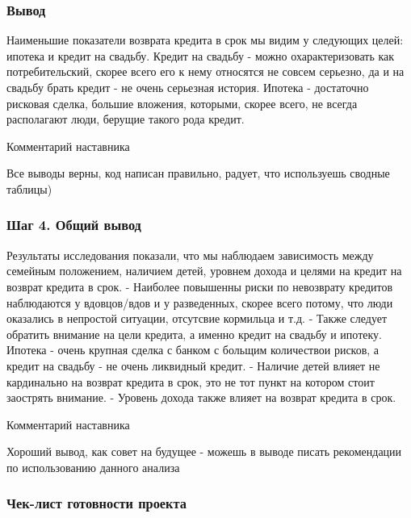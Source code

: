 \documentclass[11pt]{article}
\begin{document}
    \hypertarget{ux432ux44bux432ux43eux434}{%
\subsubsection{Вывод}\label{ux432ux44bux432ux43eux434}}

    Наименьшие показатели возврата кредита в срок мы видим у следующих
целей: ипотека и кредит на свадьбу. Кредит на свадьбу - можно
охарактеризовать как потребительский, скорее всего его к нему относятся
не совсем серьезно, да и на свадьбу брать кредит - не очень серьезная
история. Ипотека - достаточно рисковая сделка, большие вложения,
которыми, скорее всего, не всегда располагают люди, берущие такого рода
кредит.

    Комментарий наставника

Все выводы верны, код написан правильно, радует, что используешь сводные
таблицы)

    \hypertarget{ux448ux430ux433-4.-ux43eux431ux449ux438ux439-ux432ux44bux432ux43eux434}{%
\subsubsection{Шаг 4. Общий
вывод}\label{ux448ux430ux433-4.-ux43eux431ux449ux438ux439-ux432ux44bux432ux43eux434}}

    Результаты исследования показали, что мы наблюдаем зависимость между
семейным положением, наличием детей, уровнем дохода и целями на кредит
на возврат кредита в срок. - Наиболее повышенны риски по невозврату
кредитов наблюдаются у вдовцов/вдов и у разведенных, скорее всего
потому, что люди оказались в непростой ситуации, отсутсвие кормильца и
т.д. - Также следует обратить внимание на цели кредита, а именно кредит
на свадьбу и ипотеку. Ипотека - очень крупная сделка с банком с больщим
количествои рисков, а кредит на свадьбу - не очень ликвидный кредит. -
Наличие детей влияет не кардинально на возврат кредита в срок, это не
тот пункт на котором стоит заострять внимание. - Уровень дохода также
влияет на возврат кредита в срок.

    Комментарий наставника

Хороший вывод, как совет на будущее - можешь в выводе писать
рекомендации по использованию данного анализа

    \hypertarget{ux447ux435ux43a-ux43bux438ux441ux442-ux433ux43eux442ux43eux432ux43dux43eux441ux442ux438-ux43fux440ux43eux435ux43aux442ux430}{%
\subsubsection{Чек-лист готовности
проекта}\label{ux447ux435ux43a-ux43bux438ux441ux442-ux433ux43eux442ux43eux432ux43dux43eux441ux442ux438-ux43fux440ux43eux435ux43aux442ux430}}
\end{document}
